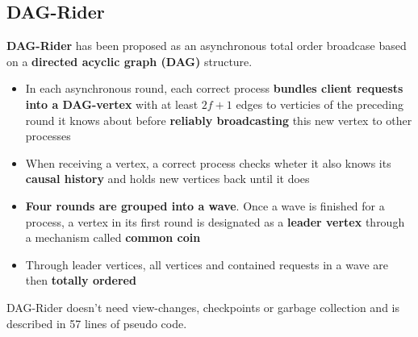 \documentclass[12pt,A4]{extarticle}
\begin{document}
\subsection{DAG-Rider}
\textbf{DAG-Rider} \cite{dagRider} has been proposed as an asynchronous total order broadcase based on a \textbf{directed acyclic graph (DAG)} structure.
\begin{itemize}
  \item In each asynchronous round, each correct process \textbf{bundles client requests into a DAG-vertex} with at least $2f + 1$ edges to verticies of the preceding round it knows about before \textbf{reliably broadcasting} this new vertex to other processes
  \item When receiving a vertex, a correct process checks wheter it also knows its \textbf{causal history} and holds new vertices back until it does
  \item \textbf{Four rounds are grouped into a wave}. Once a wave is finished for a process, a vertex in its first round is designated as a \textbf{leader vertex} through a mechanism called \textbf{common coin}
  \item Through leader vertices, all vertices and contained requests in a wave are then \textbf{totally ordered}
\end{itemize}
DAG-Rider doesn't need view-changes, checkpoints or garbage collection and is described in 57 lines of pseudo code.

\newpage


\end{document}
